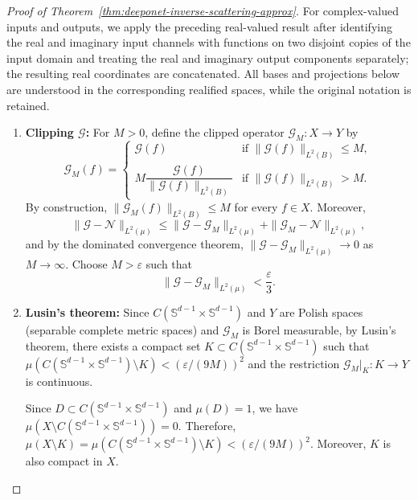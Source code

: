 \documentclass{article}
\numberwithin{equation}{section}
\theoremstyle{plain}
\begin{document}
	\begin{proof}[Proof of Theorem~\ref{thm:deeponet-inverse-scattering-approx}]
		For complex-valued inputs and outputs, we apply the preceding real-valued result after identifying the real and imaginary input channels with functions on two disjoint copies of the input domain and treating the real and imaginary output components separately; the resulting real coordinates are concatenated. All bases and projections below are understood in the corresponding realified spaces, while the original notation is retained.
		\begin{enumerate}
			\item \textbf{Clipping $\mathscr{G}$:}  
			For $M > 0$, define the clipped operator $\mathscr{G}_M: X \to Y$ by
			\begin{equation*}
				\mathscr{G}_M(f) = 
				\begin{cases}
					\mathscr{G}(f) & \text{if } \|\mathscr{G}(f)\|_{L^2(B)} \leq M, \\
					M \dfrac{\mathscr{G}(f)}{\|\mathscr{G}(f)\|_{L^2(B)}} & \text{if } \|\mathscr{G}(f)\|_{L^2(B)} > M.
				\end{cases}
			\end{equation*}
			By construction, $\|\mathscr G_M(f)\|_{L^2(B)}\le M$ for every
			$f\in X$. Moreover,
			\begin{equation*}
				\| \mathscr{G} - \mathscr{N} \|_{L^2(\mu)} \leq \| \mathscr{G} - \mathscr{G}_M \|_{L^2(\mu)} + \| \mathscr{G}_M - \mathscr{N} \|_{L^2(\mu)},
			\end{equation*}
			and by the dominated convergence theorem, $\|\mathscr{G} - \mathscr{G}_M\|_{L^2(\mu)} \to 0$ as $M \to \infty$. Choose $M > \varepsilon$ such that
			\begin{equation}
				\| \mathscr{G} - \mathscr{G}_M \|_{L^2(\mu)} < \frac{\varepsilon}{3}. \label{eq:2.1}
			\end{equation}
			
			\item \textbf{Lusin's theorem:}  
			Since $C(\mathbb{S}^{d-1} \times \mathbb{S}^{d-1})$ and $Y$ are Polish spaces (separable complete metric spaces) and $\mathscr{G}_M$ is Borel measurable, by Lusin's theorem, there exists a compact set $K \subset C(\mathbb{S}^{d-1} \times \mathbb{S}^{d-1})$ such that $\mu(C(\mathbb{S}^{d-1} \times \mathbb{S}^{d-1}) \setminus K) < (\varepsilon/(9M))^2$ and the restriction $\mathscr{G}_M|_K: K \to Y$ is continuous.
			
			Since $D\subset C(\mathbb{S}^{d-1} \times \mathbb{S}^{d-1})$ and $\mu(D)=1$, we have $\mu(X \setminus C(\mathbb{S}^{d-1} \times \mathbb{S}^{d-1}))=0$. Therefore, $\mu(X \setminus K)=\mu(C(\mathbb{S}^{d-1} \times \mathbb{S}^{d-1}) \setminus K)<(\varepsilon/(9M))^2.$
			Moreover, $K$ is also compact in $X$.
			

\end{enumerate}
\end{proof}
\end{document}
